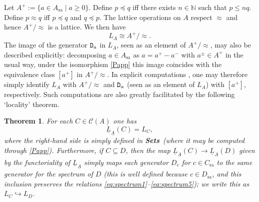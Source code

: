 \documentclass[11pt]{article}
\newcommand{\beq}{\begin{equation}}
\newcommand{\eeq}{\end{equation}}
\newcommand{\Sets}{\mbox{\textbf{Sets}}}
\newcommand{\raw}{\rightarrow} \newcommand{\rat}{\mapsto}
\newcommand{\er}{\eqref}
\newcommand{\CA}{{\mathcal A}} \newcommand{\CB}{{\mathcal B}}
\newcommand{\alg}[1]{\ensuremath{#1}}
\newcommand{\context}{\ensuremath{\mathcal{C}}}
\newcommand{\sa}{\ensuremath{_{\mathrm{sa}}}}
\newcommand{\prop}[1]{\ensuremath{\mbox{\texttt{#1}}}}
\newcommand{\uA}{\underline{A}}
\renewcommand{\CA}{\mathcal{C}(A)}
\renewcommand{\CA}{\context(\alg{A})}
\newtheorem{theorem}{Theorem}
\begin{document}
Let $A^+:=\{a \in A\sa \mid a \geq 0\}$. Define $p \preccurlyeq
q$ iff there exists $n\in\mathbb{N}$ such that $p\leqslant
n q$. Define $p \approx q$ iff $p\preccurlyeq q$ and $q\preccurlyeq p$. The
lattice operations on $A$ respect $\approx$ and hence $A^+/\approx$ is a lattice.
We then have
\beq 
L_A \cong A^+/\approx. \label{Papp}
\eeq
The image of the generator  $\prop{D}_a$ in $L_A$, seen as an element of $A^+/\approx$, may also be described explicitly:
 decomposing $a\in A\sa$ as $a=a^+-a^-$ with $a^{\pm}\in A^+$ in the usual way, under the isomorphism \er{Papp} this image coincides with the equivalence class $[a^+]$ in $A^+/\approx$.
In explicit computations \cite{HLSFP,HLSSyn}, one may  therefore simply  identify $L_A$ with $A^+/\approx$ and $\prop{D}_a$ (seen as an element of $L_A$) with $[a^+]$, respectively. Such computations are also greatly facilitated by the following `locality' theorem.
\begin{theorem}\label{thm:internalspectrum}
For each $C\in\CA$ one has
 \beq \underline{L}_{\uA}(C)=L_C, \label{Llocal}\eeq
 where the right-hand side is simply defined in \Sets\ (where it may be computed through \er{Papp}). 
 Furthermore,  if $C\subseteq D$, then the map $\underline{L}_{\uA}(C)\raw \underline{L}_{\uA}(D)$  given by the functoriality of $\underline{L}_{\uA}$
simply maps each generator $D_c$ for $c\in C\sa$  to the same generator
for the spectrum of $D$ (this is well defined because $c\in D\sa$,
and this inclusion  preserves the relations
\er{eq:spectrum1}--\er{eq:spectrum5}); we write this as $L_C\hookrightarrow L_D$.
\end{theorem}
\end{document}
